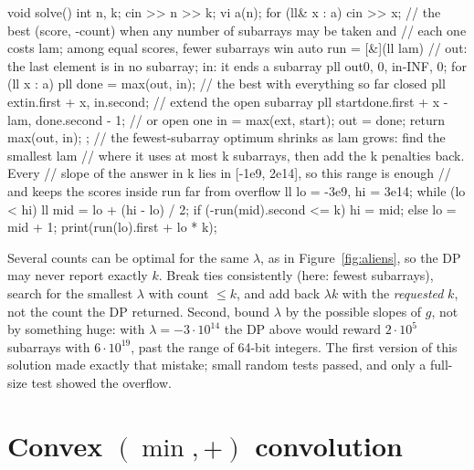 \begin{code}
void solve() {
    int n, k;
    cin >> n >> k;
    vi a(n);
    for (ll& x : a) cin >> x;
    // the best (score, -count) when any number of subarrays may be taken and
    // each one costs lam; among equal scores, fewer subarrays win
    auto run = [&](ll lam) {
        // out: the last element is in no subarray; in: it ends a subarray
        pll out{0, 0}, in{-INF, 0};
        for (ll x : a) {
            pll done = max(out, in);  // the best with everything so far closed
            pll ext{in.first + x, in.second};  // extend the open subarray
            pll start{done.first + x - lam, done.second - 1};  // or open one
            in = max(ext, start);
            out = done;
        }
        return max(out, in);
    };
    // the fewest-subarray optimum shrinks as lam grows: find the smallest lam
    // where it uses at most k subarrays, then add the k penalties back. Every
    // slope of the answer in k lies in [-1e9, 2e14], so this range is enough
    // and keeps the scores inside run far from overflow
    ll lo = -3e9, hi = 3e14;
    while (lo < hi) {
        ll mid = lo + (hi - lo) / 2;
        if (-run(mid).second <= k) hi = mid;
        else lo = mid + 1;
    }
    print(run(lo).first + lo * k);
}
\end{code}

\begin{pitfall}
Several counts can be optimal for the same $\lambda$, as in Figure~\ref{fig:aliens}, so the DP may never report exactly $k$. Break ties
consistently (here: fewest subarrays), search for the smallest $\lambda$ with count $\le k$, and add back $\lambda k$ with the
\emph{requested} $k$, not the count the DP returned. Second, bound $\lambda$ by the possible slopes of $g$, not by something huge:
with $\lambda = -3 \cdot 10^{14}$ the DP above would reward $2 \cdot 10^5$ subarrays with $6 \cdot 10^{19}$, past the range of 64-bit
integers. The first version of this solution made exactly that mistake; small random tests passed, and only a full-size test showed
the overflow.
\end{pitfall}

\section[Convex (min, +) convolution]{Convex $(\min, +)$ convolution \hfill \ioi}\label{sec:minplus}

